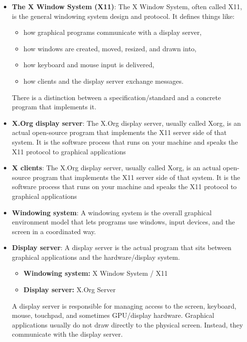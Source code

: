 \documentclass{report}
\begin{document}
    \begin{itemize}
        \item \textbf{The X Window System (X11)}:  The X Window System, often called X11, is the general windowing system design and protocol. It defines things like:
            \begin{itemize}
                \item how graphical programs communicate with a display server,
                \item how windows are created, moved, resized, and drawn into,
                \item how keyboard and mouse input is delivered,
                \item how clients and the display server exchange messages.
            \end{itemize}
            There is a distinction between a specification/standard and a concrete program that implements it.
        \item \textbf{X.Org display server}: The X.Org display server, usually called Xorg, is an actual open-source program that implements the X11 server side of that system. It is the software process that runs on your machine and speaks the X11 protocol to graphical applications
        \item \textbf{X clients}: The X.Org display server, usually called Xorg, is an actual open-source program that implements the X11 server side of that system. It is the software process that runs on your machine and speaks the X11 protocol to graphical applications
        \item \textbf{Windowing system}: A windowing system is the overall graphical environment model that lets programs use windows, input devices, and the screen in a coordinated way.
        \item \textbf{Display server}: A display server is the actual program that sits between graphical applications and the hardware/display system.
            \begin{itemize}
                \item \textbf{Windowing system:} X Window System / X11
                \item \textbf{Display server:}   X.Org Server
            \end{itemize}
            A display server is responsible for managing access to the screen, keyboard, mouse, touchpad, and sometimes GPU/display hardware. Graphical applications usually do not draw directly to the physical screen. Instead, they communicate with the display server.

\end{itemize}
\end{document}

